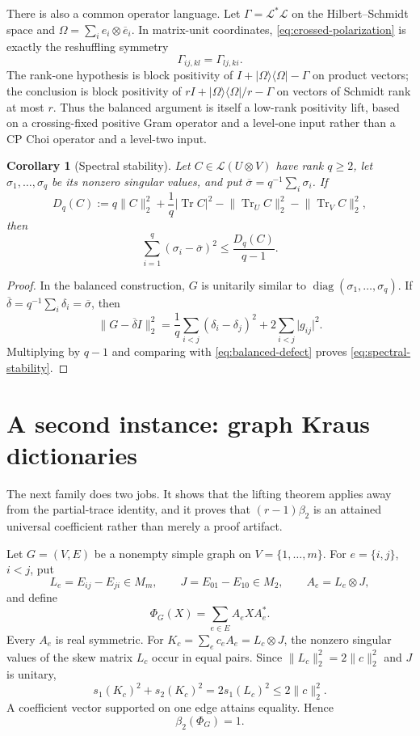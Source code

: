 \documentclass[11pt,reqno]{amsart}
\newtheorem{corollary}[theorem]{Corollary}
\theoremstyle{remark}
\DeclareMathOperator{\Tr}{Tr}
\newcommand{\cL}{\mathcal L}
\newcommand{\norm}[1]{\lVert #1\rVert}
\newcommand{\abs}[1]{\lvert #1\rvert}
\newcommand{\ketbra}[2]{\lvert #1\rangle\!\langle #2\rvert}
\begin{document}
There is also a common operator language.  Let
$\Gamma=\mathcal L^*\mathcal L$ on the Hilbert--Schmidt space and
$\Omega=\sum_i e_i\otimes\overline e_i$.  In matrix-unit coordinates,
\cref{eq:crossed-polarization} is exactly the reshuffling symmetry
\[
  \Gamma_{ij,kl}=\Gamma_{lj,ki}.
\]
The rank-one hypothesis is block positivity of
$I+\ketbra{\Omega}{\Omega}-\Gamma$ on product vectors; the conclusion is
block positivity of
$rI+\ketbra{\Omega}{\Omega}/r-\Gamma$ on vectors of Schmidt rank at most $r$.
Thus the balanced argument is itself a low-rank positivity lift, based on a
crossing-fixed positive Gram operator and a level-one input rather than a CP
Choi operator and a level-two input.

\begin{corollary}[Spectral stability]
\label{cor:spectral-stability}
Let $C\in\cL(U\otimes V)$ have rank $q\ge2$, let
$\sigma_1,\dots,\sigma_q$ be its nonzero singular values, and put
$\overline\sigma=q^{-1}\sum_i\sigma_i$.  If
\[
  D_q(C):=
  q\norm C_2^2+\frac1q\abs{\Tr C}^2
  -\norm{\Tr_U C}_2^2-\norm{\Tr_V C}_2^2,
\]
then
\begin{equation}
\label{eq:spectral-stability}
  \sum_{i=1}^q(\sigma_i-\overline\sigma)^2
  \le\frac{D_q(C)}{q-1}.
\end{equation}
\end{corollary}

\begin{proof}
In the balanced construction, $G$ is unitarily similar to
$\operatorname{diag}(\sigma_1,\dots,\sigma_q)$.  If
$\overline\delta=q^{-1}\sum_i\delta_i=\overline\sigma$, then
\[
  \norm{G-\overline\delta I}_2^2
  =\frac1q\sum_{i<j}(\delta_i-\delta_j)^2
    +2\sum_{i<j}\abs{g_{ij}}^2.
\]
Multiplying by $q-1$ and comparing with
\cref{eq:balanced-defect} proves \cref{eq:spectral-stability}.
\end{proof}

\section{A second instance: graph Kraus dictionaries}
\label{sec:graphs}

The next family does two jobs.  It shows that the lifting theorem applies
away from the partial-trace identity, and it proves that
$(r-1)\beta_2$ is an attained universal coefficient rather than merely a
proof artifact.

Let $G=(V,E)$ be a nonempty simple graph on $V=\{1,\dots,m\}$.  For
$e=\{i,j\}$, $i<j$, put
\[
  L_e=E_{ij}-E_{ji}\in M_m,\qquad
  J=E_{01}-E_{10}\in M_2,\qquad
  A_e=L_e\otimes J,
\]
and define
\begin{equation}
\label{eq:graph-map}
  \Phi_G(X)=\sum_{e\in E}A_eXA_e^*.
\end{equation}
Every $A_e$ is real symmetric.  For
$K_c=\sum_ec_eA_e=L_c\otimes J$, the nonzero singular values of the
skew matrix $L_c$ occur in equal pairs.  Since
$\norm{L_c}_2^2=2\norm c_2^2$ and $J$ is unitary,
\[
  s_1(K_c)^2+s_2(K_c)^2
  =2s_1(L_c)^2\le2\norm c_2^2.
\]
A coefficient vector supported on one edge attains equality.  Hence
\begin{equation}
\label{eq:graph-beta}
  \beta_2(\Phi_G)=1.
\end{equation}
\end{document}
